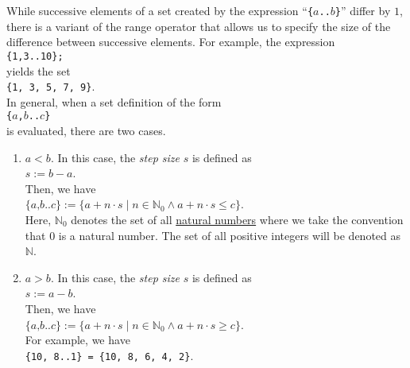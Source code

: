 While successive elements of a set created by the expression ``\texttt{\{$a$..$b$\}}''
differ by $1$, there is a variant of the range operator that allows us to
specify the size of the difference between successive elements.   For example, the expression
\\[0.2cm]
\hspace*{1.3cm}
\texttt{\{1,3..10\};}
\\[0.2cm]
yields the set
\\[0.2cm]
\hspace*{1.3cm}
\texttt{\{1, 3, 5, 7, 9\}}.
\\[0.2cm]
In general, when a set definition of the form
\\[0.2cm]
\hspace*{1.3cm}
\texttt{\{$a$,$b$..$c$\}}
\\[0.2cm]
is evaluated, there are two cases.
\begin{enumerate}
\item $a < b$.  In this case, the \textsl{step size} $s$ is defined as
      \\[0.2cm]
      \hspace*{1.3cm}
      $s := b - a$.
      \\[0.2cm]
      Then, we have
      \\[0.2cm]
      \hspace*{1.3cm}
      $\texttt{\{$a$,$b$..$c$\}} := 
       \{ a + n \cdot s \mid n \in \mathbb{N}_0 \wedge a + n \cdot s \leq c  \}
      $.
      \\[0.2cm]
      Here, $\mathbb{N}_0$ denotes the set of all \href{https://en.wikipedia.org/wiki/Natural_number}{natural numbers} 
      where we take the convention that $0$ is a natural number.  The set of all positive integers will be
      denoted as $\mathbb{N}$. 
\item $a > b$.  In this case, the \textsl{step size} $s$ is defined as
      \\[0.2cm]
      \hspace*{1.3cm}
      $s := a - b$.
      \\[0.2cm]
      Then, we have
      \\[0.2cm]
      \hspace*{1.3cm}
      $\texttt{\{$a$,$b$..$c$\}} := 
       \{ a + n \cdot s \mid n \in \mathbb{N}_0 \wedge a + n \cdot s \geq c  \}
      $.
      \\[0.2cm]
      For example, we have
      \\[0.2cm]
      \hspace*{1.3cm}
      \texttt{\{10, 8..1\} = \{10, 8, 6, 4, 2\}}.
\end{enumerate}

